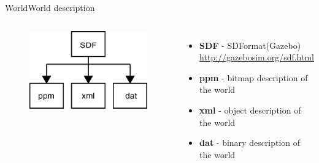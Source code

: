 \begin{frame}{World}{World description}

\begin{columns}
\begin{minipage}{\textwidth}
\begin{figure}
\centering
\includegraphics[width = \textwidth]{./figure/world_conversion.pdf}
\end{figure}
\end{minipage}

\begin{minipage}{\textwidth}
\begin{itemize}
\item \textbf{SDF} - SDFormat(Gazebo) \\
\url{http://gazebosim.org/sdf.html}
\item \textbf{ppm} - bitmap description of the world 
\item \textbf{xml} - object description of the world
\item \textbf{dat} - binary description of the world
\end{itemize}
\end{minipage}
\end{columns}

\end{frame}